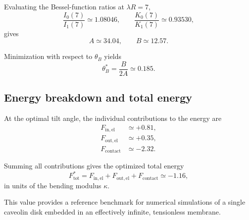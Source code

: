 \documentclass[11pt]{article}
\begin{document}
Evaluating the Bessel-function ratios at \(\lambda R = 7\),
\begin{equation}
\frac{I_0(7)}{I_1(7)} \simeq 1.08046,
\qquad
\frac{K_0(7)}{K_1(7)} \simeq 0.93530 ,
\end{equation}
gives
\begin{equation}
A \simeq 34.04,
\qquad
B \simeq 12.57 .
\end{equation}

Minimization with respect to \(\theta_B\) yields
\begin{equation}
\theta_B^{\ast} = \frac{B}{2A} \simeq 0.185 .
\end{equation}

\subsection{Energy breakdown and total energy}

At the optimal tilt angle, the individual contributions to the energy are
\begin{align}
F_{\mathrm{in,el}} &\simeq +0.81 , \\
F_{\mathrm{out,el}} &\simeq +0.35 , \\
F_{\mathrm{contact}} &\simeq -2.32 .
\end{align}

Summing all contributions gives the optimized total energy
\begin{equation}
F_{\mathrm{tot}}^{\ast}
=
F_{\mathrm{in,el}} + F_{\mathrm{out,el}} + F_{\mathrm{contact}}
\simeq -1.16 ,
\end{equation}
in units of the bending modulus \(\kappa\).

This value provides a reference benchmark for numerical simulations of
a single caveolin disk embedded in an effectively infinite,
tensionless membrane.
\end{document}
